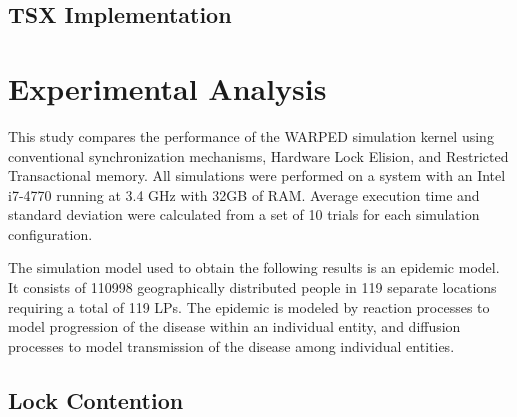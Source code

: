 \documentclass[a4paper]{article}
\begin{document}
%
%

\subsection{\textbf{TSX Implementation}}

\newpage
\section{\textbf{Experimental Analysis}}

This study compares the performance of the WARPED simulation kernel
using conventional synchronization mechanisms, Hardware Lock Elision, and
Restricted Transactional memory.  All simulations were performed on a system
with an Intel i7-4770 running at 3.4 GHz with 32GB of RAM.  Average execution
time and standard deviation were calculated from a set of 10 trials for each
simulation configuration.\par

The simulation model used to obtain the following results is an epidemic
model.  It consists of 110998 geographically distributed people in 119 separate
locations requiring a total of 119 LPs.  The epidemic is modeled by reaction processes
to model progression of the disease within an individual entity, and diffusion
processes to model transmission of the disease among individual entities.\par

\subsection{\textbf{Lock Contention}}
\end{document}
